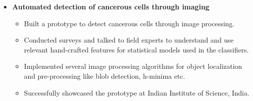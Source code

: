 \documentclass[10pt,letterpaper,sans]{moderncv}        %
\begin{document}
\begin{small}
\begin{itemize}
\item \textbf{Automated detection of cancerous cells through imaging}
\begin{itemize}
\item Built a prototype to detect cancerous cells through image processing.
\item Conducted surveys and talked to field experts to understand and use relevant hand-crafted features for statistical models used in the classifiers.
\item Implemented several image processing algorithms for object localization and pre-processing like blob detection, h-minima etc.
\item Successfully showcased the prototype at Indian Institute of Science, India.
\end{itemize}

\end{itemize}
\end{small}
\end{document}
